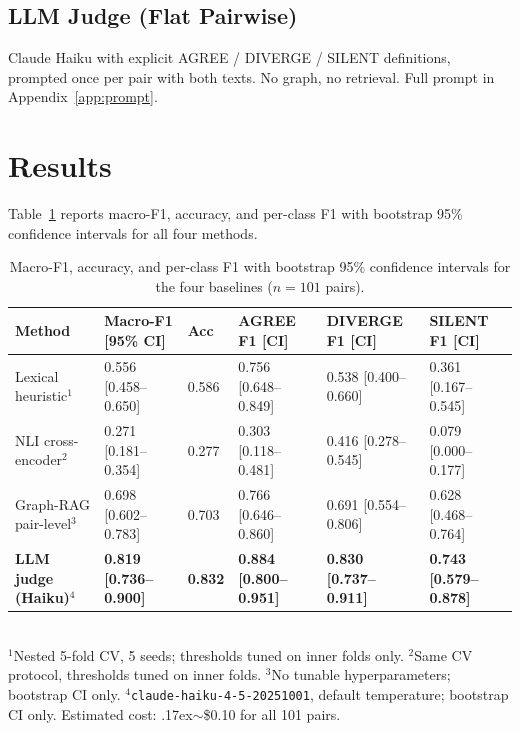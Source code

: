 \documentclass[sigconf]{acmart}
\begin{document}
\subsection{LLM Judge (Flat Pairwise)}

Claude Haiku with explicit AGREE / DIVERGE / SILENT definitions, prompted once
per pair with both texts. No graph, no retrieval. Full prompt in
Appendix~\ref{app:prompt}.

\section{Results}

Table~\ref{tab:results} reports macro-F1, accuracy, and per-class F1 with
bootstrap 95\% confidence intervals for all four methods.

\begin{table}
  \caption{Macro-F1, accuracy, and per-class F1 with bootstrap 95\% confidence
    intervals for the four baselines ($n = 101$ pairs).}
  \label{tab:results}
  \begin{tabular}{llllll}
    \toprule
    Method & Macro-F1 [95\% CI] & Acc & AGREE F1 [CI] & DIVERGE F1 [CI] & SILENT F1 [CI] \\
    \midrule
    Lexical heuristic$^1$
      & 0.556 [0.458--0.650] & 0.586
      & 0.756 [0.648--0.849] & 0.538 [0.400--0.660] & 0.361 [0.167--0.545] \\
    NLI cross-encoder$^2$
      & 0.271 [0.181--0.354] & 0.277
      & 0.303 [0.118--0.481] & 0.416 [0.278--0.545] & 0.079 [0.000--0.177] \\
    Graph-RAG pair-level$^3$
      & 0.698 [0.602--0.783] & 0.703
      & 0.766 [0.646--0.860] & 0.691 [0.554--0.806] & 0.628 [0.468--0.764] \\
    \textbf{LLM judge (Haiku)}$^4$
      & \textbf{0.819 [0.736--0.900]} & \textbf{0.832}
      & \textbf{0.884 [0.800--0.951]} & \textbf{0.830 [0.737--0.911]}
      & \textbf{0.743 [0.579--0.878]} \\
    \bottomrule
  \end{tabular}
  \smallskip\\
  {\small $^1$Nested 5-fold CV, 5 seeds; thresholds tuned on inner folds only.
  $^2$Same CV protocol, thresholds tuned on inner folds.
  $^3$No tunable hyperparameters; bootstrap CI only.
  $^4$\texttt{claude-haiku-4-5-20251001}, default temperature; bootstrap CI
  only. Estimated cost: {\raise.17ex\hbox{$\scriptstyle\sim$}}\$0.10 for all
  101 pairs.}
\end{table}
\end{document}
